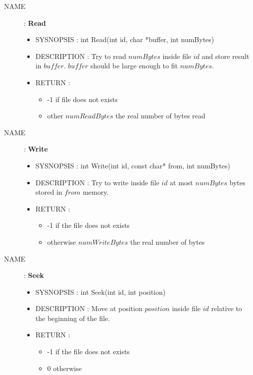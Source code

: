 \documentclass[a4paper,10pt]{article}
\begin{document}
\begin{description}
    \item [NAME] : \textbf{Read}
        \begin{itemize}
            \item SYSNOPSIS : int Read(int id, char *buffer, int numBytes)
            \item DESCRIPTION :
                Try to read $numBytes$ inside file $id$ and store result in $buffer$.
                $buffer$ should be large enough to fit $numBytes$.
            \item RETURN :
                \begin{itemize}
                    \item -1 if file does not exists
                    \item other $numReadBytes$ the real number of bytes read
                \end{itemize}
        \end{itemize}

    \item [NAME] : \textbf{Write}
        \begin{itemize}
            \item SYSNOPSIS : int Write(int id, const char* from, int numBytes)
            \item DESCRIPTION :
                Try to write inside file $id$ at most $numBytes$ bytes stored in $from$
                memory.
            \item RETURN :
                \begin{itemize}
                    \item -1 if the file does not exists
                    \item otherwise $numWriteBytes$ the real number of bytes
                \end{itemize}
        \end{itemize}

    \item [NAME] : \textbf{Seek}
        \begin{itemize}
            \item SYSNOPSIS : int Seek(int id, int position)
            \item DESCRIPTION :
                Move at position $position$ inside file $id$ relative to the beginning of
                the file.
            \item RETURN :
                \begin{itemize}
                    \item -1 if the file does not exists
                    \item 0 otherwise
                \end{itemize}
        \end{itemize}


\end{description}
\end{document}
